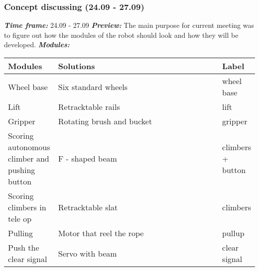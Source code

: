 \addtocounter{number_of_meeting}{1}
\subsubsection{Concept discussing (24.09 - 27.09)}
\textit{\textbf{Time frame:}} 24.09 - 27.09 \newline
\textit{\textbf{Preview:}} The main purpose for current meeting was to figure out how the modules of the robot should look and how they will be developed. \newline \newline
\textit{\textbf{Modules:}}

\begin{table}[H]
	\vspace{-2mm}
	\begin{center}
		\begin{tabular}{|p{0.2\linewidth}|p{0.7\linewidth}|p{0.1\linewidth}|}
			\hline
			Modules & Solutions & Label \\
			\hline
			Wheel base & Six standard wheels & wheel base \\
			\hline
			Lift & Retracktable rails & lift \\
			\hline
			Gripper & Rotating brush and bucket & gripper\\
			\hline
			Scoring autonomous climber and pushing button & F - shaped beam & climbers + button\\
			\hline
			Scoring climbers in tele op & Retracktable slat & climbers\\
			\hline
			Pulling & Motor that reel the rope & pullup\\
			\hline
			Push the clear signal & Servo with beam & clear signal\\
			\hline
		\end{tabular}
	\end{center}
\end{table}

